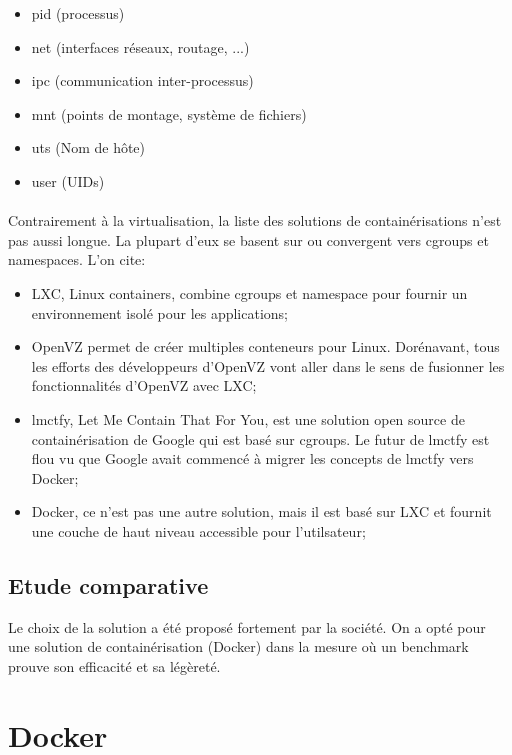 \begin{onehalfspace}
\begin{itemize}
\begin{itemize}
\item pid (processus)
\item net (interfaces réseaux, routage, ...)
\item ipc (communication inter-processus)
\item mnt (points de montage, système de fichiers)
\item uts (Nom de hôte)
\item user (UIDs)
\end{itemize}

\end{itemize}


\paragraph{}
Contrairement à la virtualisation, la liste des solutions de containérisations n'est pas aussi longue. La plupart d'eux se basent sur ou convergent vers cgroups et namespaces. L'on cite:

\begin{itemize}
\item LXC, Linux containers, combine cgroups et namespace pour fournir un environnement isolé pour les applications;
\item OpenVZ permet de créer multiples conteneurs pour Linux. Dorénavant, tous les efforts des développeurs d'OpenVZ vont aller dans le sens de fusionner les fonctionnalités d'OpenVZ avec LXC;
\item lmctfy, Let Me Contain That For You, est une solution open source de containérisation de Google qui est basé sur cgroups. Le futur de lmctfy est flou vu que Google avait commencé à migrer les concepts de lmctfy vers Docker;
\item Docker, ce n'est pas une autre solution, mais il est basé sur LXC et fournit une couche de haut niveau accessible pour l'utilsateur;

\end{itemize}

\subsection{Etude comparative}

Le choix de la solution a été proposé fortement par la société. On a opté pour une solution de containérisation (Docker) dans la mesure où un benchmark prouve son efficacité et sa légèreté.





\section{Docker}

\end{onehalfspace}